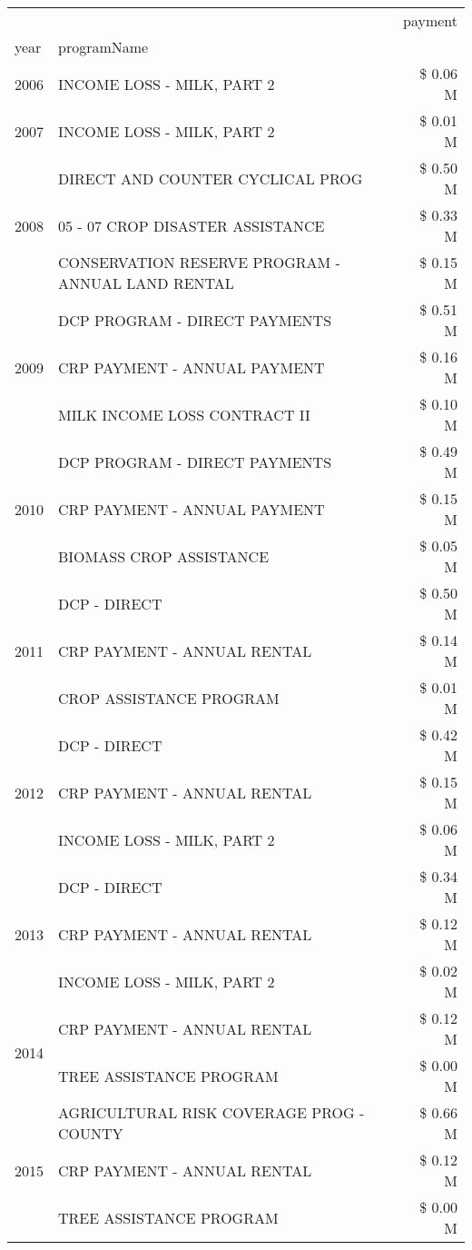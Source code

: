 \begin{tabular}{llr}
\toprule
 &  & payment \\
year & programName &  \\
\midrule
2006 & INCOME LOSS - MILK, PART 2 & \$ 0.06 M \\
\cline{1-3}
2007 & INCOME LOSS - MILK, PART 2 & \$ 0.01 M \\
\cline{1-3}
\multirow[t]{3}{*}{2008} & DIRECT AND COUNTER CYCLICAL PROG & \$ 0.50 M \\
 & 05 - 07 CROP DISASTER ASSISTANCE & \$ 0.33 M \\
 & CONSERVATION RESERVE PROGRAM - ANNUAL LAND RENTAL & \$ 0.15 M \\
\cline{1-3}
\multirow[t]{3}{*}{2009} & DCP PROGRAM - DIRECT PAYMENTS & \$ 0.51 M \\
 & CRP PAYMENT - ANNUAL PAYMENT & \$ 0.16 M \\
 & MILK INCOME LOSS CONTRACT II & \$ 0.10 M \\
\cline{1-3}
\multirow[t]{3}{*}{2010} & DCP PROGRAM - DIRECT PAYMENTS & \$ 0.49 M \\
 & CRP PAYMENT - ANNUAL PAYMENT & \$ 0.15 M \\
 & BIOMASS CROP ASSISTANCE & \$ 0.05 M \\
\cline{1-3}
\multirow[t]{3}{*}{2011} & DCP - DIRECT & \$ 0.50 M \\
 & CRP PAYMENT - ANNUAL RENTAL & \$ 0.14 M \\
 & CROP ASSISTANCE PROGRAM & \$ 0.01 M \\
\cline{1-3}
\multirow[t]{3}{*}{2012} & DCP - DIRECT & \$ 0.42 M \\
 & CRP PAYMENT - ANNUAL RENTAL & \$ 0.15 M \\
 & INCOME LOSS - MILK, PART 2 & \$ 0.06 M \\
\cline{1-3}
\multirow[t]{3}{*}{2013} & DCP - DIRECT & \$ 0.34 M \\
 & CRP PAYMENT - ANNUAL RENTAL & \$ 0.12 M \\
 & INCOME LOSS - MILK, PART 2 & \$ 0.02 M \\
\cline{1-3}
\multirow[t]{2}{*}{2014} & CRP PAYMENT - ANNUAL RENTAL & \$ 0.12 M \\
 & TREE ASSISTANCE PROGRAM & \$ 0.00 M \\
\cline{1-3}
\multirow[t]{3}{*}{2015} & AGRICULTURAL RISK COVERAGE PROG - COUNTY & \$ 0.66 M \\
 & CRP PAYMENT - ANNUAL RENTAL & \$ 0.12 M \\
 & TREE ASSISTANCE PROGRAM & \$ 0.00 M \\

\end{tabular}
